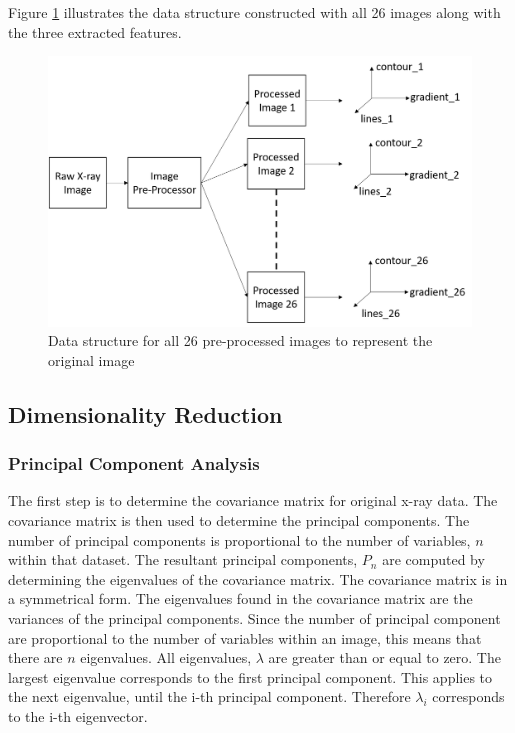 \documentclass[11pt]{article}
\begin{document}
	Figure \ref{fig: data_structure} illustrates the data structure constructed with all 26 images along with the three extracted features.
	\begin{figure}[!h]
		\centering
		\includegraphics[scale=0.3]{image_processing.png}
		\caption{Data structure for all 26 pre-processed images to represent the original image}
		\label{fig: data_structure}
	\end{figure}
	
	\subsection{Dimensionality Reduction}
	\subsubsection{Principal Component Analysis}
	The first step is to determine the covariance matrix for original x-ray data. The covariance matrix is then used to determine the principal components. The number of principal components is proportional to the number of variables, $n$ within that dataset. The resultant principal components, $P_n$ are computed by determining the eigenvalues of the covariance matrix. The covariance matrix is in a symmetrical form. The eigenvalues found in the covariance matrix are the variances of the principal components. Since the number of principal component are proportional to the number of variables within an image, this means that there are $n$ eigenvalues. All eigenvalues, $\lambda$ are greater than or equal to zero. The largest eigenvalue corresponds to the first principal component. This applies to the next eigenvalue, until the i-th principal component. Therefore $\lambda_i$ corresponds to the i-th eigenvector.
	
\end{document}
